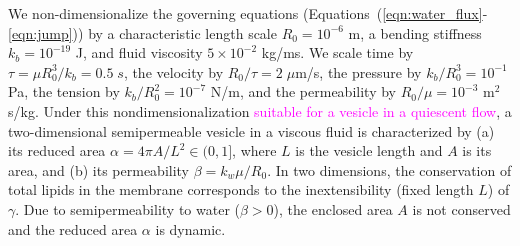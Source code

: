 \documentclass[prb,preprint,showpacs,preprintnumbers,amsmath,amssymb,longbibliography]{revtex4-1}
\begin{document}
We non-dimensionalize the governing equations (Equations~(\ref{eqn:water_flux}-\ref{eqn:jump})) by a
characteristic length scale $R_0 = 10^{-6}$ m, a bending stiffness $k_b
= 10^{-19}$ J, and fluid viscosity $5 \times 10^{-2}$ kg/ms. We scale
time by $\tau = \mu R_0^3/k_b = 0.5\;s$, the velocity by $R_0/\tau =
2\;\mu$m/s, the pressure by $k_b/R_0^3 = 10^{-1}$ Pa, the tension by
$k_b/R_0^2 = 10^{-7}$ N/m, and the permeability by $R_0/\mu = 10^{-3}$
m$^2$s/kg. Under this nondimensionalization \textcolor{magenta}{suitable for a vesicle in a quiescent flow}, a two-dimensional
semipermeable vesicle in a viscous fluid is characterized by (a) its
reduced area $\alpha = 4\pi A/L^2 \in (0,1]$, where $L$ is the vesicle
length and $A$ is its area, and (b) its permeability $\beta = k_w \mu
/R_0$. 
In two dimensions, the conservation of total lipids in the membrane corresponds to the inextensibility (fixed length $L$) of $\gamma$.
Due to semipermeability to water ($\beta>0$),  the enclosed area $A$ is not conserved and the reduced area $\alpha$ is dynamic. 


\end{document}

